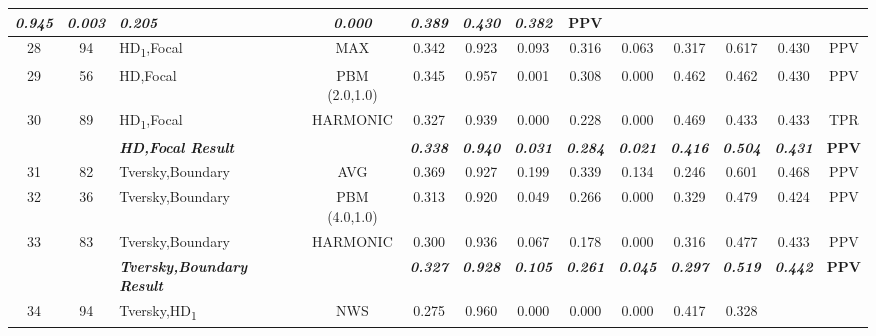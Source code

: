 \begin{table}[H]
{\begin{tabular}{cc|l|c|c|c|c|c|c|c|c|c|c|}
    \textit{\textbf{0.945}} &
    \textit{\textbf{0.003}} &
    \textit{\textbf{0.205}} &
    \textit{\textbf{0.000}} &
    \textit{\textbf{0.389}} &
    \textit{\textbf{0.430}} &
    \textit{\textbf{0.382}} &
    \textbf{PPV} \\ \hline
  \multicolumn{1}{|c|}{28} &
    94 &
    HD\textsubscript{1},Focal &
    MAX &
    0.342 &
    0.923 &
    0.093 &
    0.316 &
    0.063 &
    0.317 &
    0.617 &
    0.430 &
    PPV \\ \hline
  \multicolumn{1}{|c|}{29} &
    56 &
    HD,Focal &
    PBM (2.0,1.0) &
    0.345 &
    0.957 &
    0.001 &
    0.308 &
    0.000 &
    0.462 &
    0.462 &
    0.430 &
    PPV \\ \hline
  \multicolumn{1}{|c|}{30} &
    89 &
    HD\textsubscript{1},Focal &
    HARMONIC &
    0.327 &
    0.939 &
    0.000 &
    0.228 &
    0.000 &
    0.469 &
    0.433 &
    0.433 &
    TPR \\ \hline
   &
    \textit{\textbf{}} &
    \textit{\textbf{HD,Focal Result}} &
     &
    \textit{\textbf{0.338}} &
    \textit{\textbf{0.940}} &
    \textit{\textbf{0.031}} &
    \textit{\textbf{0.284}} &
    \textit{\textbf{0.021}} &
    \textit{\textbf{0.416}} &
    \textit{\textbf{0.504}} &
    \textit{\textbf{0.431}} &
    \textbf{PPV} \\ \hline
  \multicolumn{1}{|c|}{31} &
    82 &
    Tversky,Boundary &
    AVG &
    0.369 &
    0.927 &
    0.199 &
    0.339 &
    0.134 &
    0.246 &
    0.601 &
    0.468 &
    PPV \\ \hline
  \multicolumn{1}{|c|}{32} &
    36 &
    Tversky,Boundary &
    PBM (4.0,1.0) &
    0.313 &
    0.920 &
    0.049 &
    0.266 &
    0.000 &
    0.329 &
    0.479 &
    0.424 &
    PPV \\ \hline
  \multicolumn{1}{|c|}{33} &
    83 &
    Tversky,Boundary &
    HARMONIC &
    0.300 &
    0.936 &
    0.067 &
    0.178 &
    0.000 &
    0.316 &
    0.477 &
    0.433 &
    PPV \\ \hline
   &
    \textit{\textbf{}} &
    \textit{\textbf{Tversky,Boundary Result}} &
     &
    \textit{\textbf{0.327}} &
    \textit{\textbf{0.928}} &
    \textit{\textbf{0.105}} &
    \textit{\textbf{0.261}} &
    \textit{\textbf{0.045}} &
    \textit{\textbf{0.297}} &
    \textit{\textbf{0.519}} &
    \textit{\textbf{0.442}} &
    \textbf{PPV} \\ \hline
  \multicolumn{1}{|c|}{34} &
    94 &
    Tversky,HD\textsubscript{1} &
    NWS &
    0.275 &
    0.960 &
    0.000 &
    0.000 &
    0.000 &
    0.417 &
    0.328 &

\end{tabular}}
\end{table}
